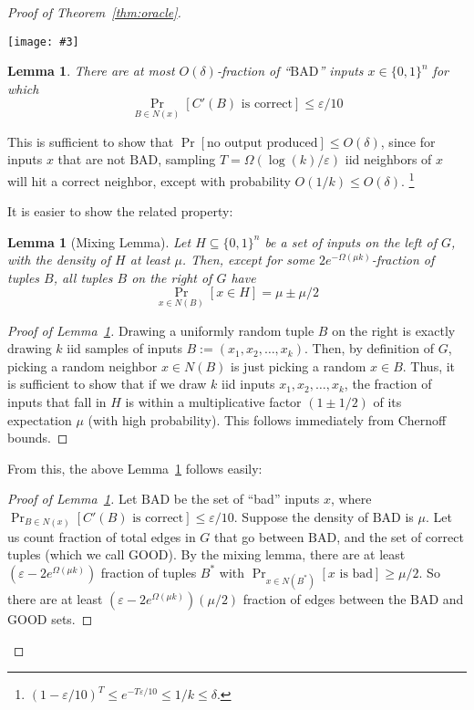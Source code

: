 \documentclass[]{article}
\newtheorem{lemma}[theorem]{Lemma}
\newcommand{\1}{\mathbb{1}}
\renewcommand{\epsilon}{\varepsilon}
\newcommand{\eps}{\epsilon}
\def\image#1#2#3{\begin{center}\texttt{[image: \#3]}\end{center}}
\begin{document}
\begin{proof}[Proof of Theorem~\ref{thm:oracle}]
\image{width=200}{./graph_color.png}{graph_color.png}

\newcommand{\bad}{\text{BAD}}
\newcommand{\good}{\text{GOOD}}

\begin{lemma}
    \label{lem:notbad}
    There are at most $O(\delta)$-fraction of ``$\bad$'' inputs $x \in \{0, 1\}^n$
    for which
    $$\Pr_{B \in N(x)}[C'(B) \text{ is correct}] \leq \epsilon/10$$
\end{lemma}
This is sufficient to show that $\Pr[\text{no output produced}] \leq O(\delta)$,
since for inputs $x$ that are not $\bad$, sampling
$T = \Omega(\log(k)/\eps)$ iid neighbors of $x$ will hit a correct neighbor,
except with probability $O(1/k) \leq O(\delta)$.
\footnote{
$(1-\eps/10)^{T} \leq e^{-T\eps / 10} \leq 1/k \leq \delta$.
}

It is easier to show the related property:
\begin{lemma}[Mixing Lemma]
    \label{lem:mixing}
    Let $H \subseteq \{0, 1\}^n$ be a set of inputs on the left of $G$,
    with the density of $H$ at
    least $\mu$.
    Then, except for some $2e^{-\Omega(\mu k)}$-fraction of tuples $B$,
    all tuples $B$ on the right of $G$ have
    $$\Pr_{x \in N(B)}[x \in H] = \mu \pm \mu/2$$
\end{lemma}
\begin{proof}[Proof of Lemma~\ref{lem:mixing}]
    Drawing a uniformly random tuple $B$ on the right is
    exactly drawing $k$ iid samples of inputs
    $B := (x_1, x_2, \dots, x_k)$.
    Then, by definition of $G$, picking a random neighbor $x \in N(B)$
    is just picking a random $x \in B$.
    Thus, it is sufficient to show that
    if we draw $k$ iid inputs $x_1, x_2, \dots, x_k$,
    the fraction of inputs that fall in $H$
    is within a multiplicative factor $(1 \pm 1/2)$ of its expectation $\mu$
    (with high probability).
    This follows immediately from Chernoff bounds.
\end{proof}

From this, the above Lemma~\ref{lem:notbad} follows easily:

\begin{proof}[Proof of Lemma~\ref{lem:notbad}]
Let $\bad$ be the set of ``bad'' inputs $x$, where
$\Pr_{B \in N(x)}[C'(B) \text{ is correct}] \leq \epsilon/10$.
Suppose the density of $\bad$ is $\mu$.
Let us count fraction of total edges in $G$ that go between
$\bad$, and the set of correct tuples (which we call $\good$).
By the mixing lemma, there are at least
$(\epsilon - 2e^{\Omega(\mu k)})$
fraction of tuples $B^*$ with
$\Pr_{x \in N(B^*)}[\text{$x$ is bad}] \geq \mu / 2$.
So there are at least
$(\epsilon - 2e^{\Omega(\mu k)}) (\mu/2)$
fraction of edges between the $\bad$ and $\good$ sets.


\end{proof}
\end{proof}
\end{document}
